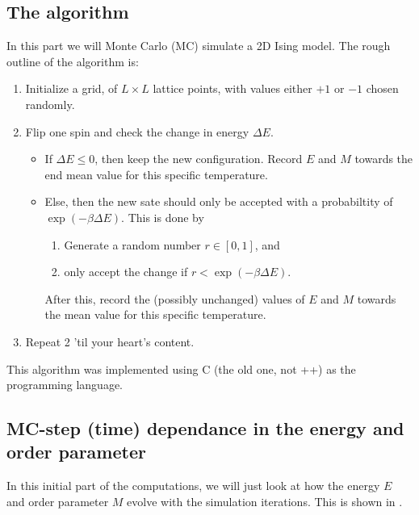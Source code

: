 \documentclass[11pt,letter, swedish, english
]{article}
\newcommand{\DE}{\ensuremath{\Delta{E}}}
\begin{document}
\subsection{The algorithm}
In this part we will Monte Carlo (MC) simulate a 2D Ising model. The
rough outline of the algorithm is:
\begin{enumerate}
\item Initialize a grid, of $L\times L$ lattice points, with values
either $+1$ or $-1$ chosen randomly.
\item Flip one spin and check the change in energy $\DE$.
\begin{itemize}
\item If $\DE\le0$, then keep the new configuration. Record $E$ and
$M$ towards the end mean value for this specific
temperature\footnotemark{}.
\item Else, then the new sate should only be accepted with a
probabiltity of $\exp(-\beta\DE)$. This is done by
\begin{enumerate}
\item Generate a random number $r\in[0, 1]$, and
\item only accept the change if $r<\exp(-\beta\DE)$.
\end{enumerate}
\addtocounter{footnote}{-1}
After this, record the (possibly unchanged) values of $E$ and $M$
towards the mean value for this specific temperature\footnotemark{}. 
\end{itemize}
\item Repeat 2 'til your heart's content.
\end{enumerate}
This algorithm was implemented using C (the old one, not ++) as the
programming language. 






\subsection{MC-step (time) dependance in the energy 
and order parameter}
In this initial part of the computations, we will just look at how the
energy $E$ and order parameter $M$ evolve with the simulation
iterations. This is shown in . 
\end{document}
